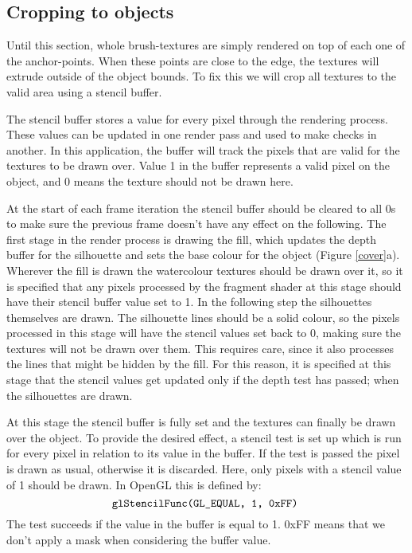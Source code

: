 \documentclass[a4paper,10pt]{article}
\begin{document}
\subsection{Cropping to objects}
Until this section, whole brush-textures are simply rendered on top of each one of the anchor-points. When these points are close to the edge, the textures will extrude outside of the object bounds. To fix this we will crop all textures to the valid area using a stencil buffer.

The stencil buffer stores a value for every pixel through the rendering process. These values can be updated in one render pass and used to make checks in another. In this application, the buffer will track the pixels that are valid for the textures to be drawn over. Value 1 in the buffer represents a valid pixel on the object, and 0 means the texture should not be drawn here.

At the start of each frame iteration the stencil buffer should be cleared to all 0s to make sure the previous frame doesn't have any effect on the following. The first stage in the render process is drawing the fill, which updates the depth buffer for the silhouette and sets the base colour for the object (Figure \ref{cover}a). Wherever the fill is drawn the watercolour textures should be drawn over it, so it is specified that any pixels processed by the fragment shader at this stage should have their stencil buffer value set to 1. In the following step the silhouettes themselves are drawn. The silhouette lines should be a solid colour, so the pixels processed in this stage will have the stencil values set back to 0, making sure the textures will not be drawn over them. This requires care, since it also processes the lines that might be hidden by the fill. For this reason, it is specified at this stage that the stencil values get updated only if the depth test has passed; when the silhouettes are drawn.

At this stage the stencil buffer is fully set and the textures can finally be drawn over the object. To provide the desired effect, a stencil test is set up which is run for every pixel in relation to its value in the buffer. If the test is passed the pixel is drawn as usual, otherwise it is discarded. Here, only pixels with a stencil value of 1 should be drawn. In OpenGL this is defined by:
$$\texttt{glStencilFunc(GL\_EQUAL, 1, 0xFF)\;}$$
The test succeeds if the value in the buffer is equal to 1. 0xFF means that we don't apply a mask when considering the buffer value.
\end{document}
